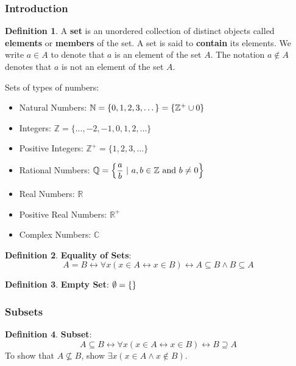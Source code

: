 \documentclass[article, 11pt]{article}
\theoremstyle{definition}
\newtheorem{definition}{Definition}[section]
\newcommand{\lra}{\leftrightarrow} %
\newcommand{\df}{\displaystyle\frac} %
\DeclarePairedDelimiter\set{\{}{\}}
\newcommand{\unite}{\cup}
\newcommand{\reals}{\mathbb{R}}
\newcommand{\ints}{\mathbb{Z}}
\newcommand{\posints}{\mathbb{Z}^+}
\newcommand{\nats}{\mathbb{N}} %
\newcommand{\rats}{\mathbb{Q}}
\newcommand{\comps}{\mathbb{C}}
\begin{document}
    \subsubsection{Introduction}
    \begin{definition}
        A \textbf{set} is an unordered collection of distinct objects called \textbf{elements} or \textbf{members} of the set. A set is said to \textbf{contain} its elements. We write $a \in A$ to denote that $a$ is an element of the set $A$. The notation $a \notin A$ denotes that $a$ is not an element of the set $A$.   
    \end{definition}

    Sets of types of numbers:
    \begin{itemize}
        \item Natural Numbers: $\nats = \{0, 1, 2, 3, \dots\} = \set*{\posints \unite 0}$
        \item Integers: $\ints = \{..., -2, -1, 0, 1, 2, \dots\}$
        \item Positive Integers: $\ints^+ = \{1, 2, 3, \dots\}$
        \item Rational Numbers: $\rats = \set*{\df{a}{b} \ | \ a, b \in \ints \text{ and } b \neq 0}$
        \item Real Numbers: $\reals$
        \item Positive Real Numbers: $\reals^+$
        \item Complex Numbers: $\comps$
    \end{itemize}

    \begin{definition}
        \textbf{Equality of Sets}:
        \begin{equation*}
            A=B \lra \forall x (x \in A \lra x \in B) \lra A \subseteq B \land B \subseteq A   
        \end{equation*}
    \end{definition}

    \begin{definition}
        \textbf{Empty Set}: $\emptyset = \set*{}$
    \end{definition}
    \subsubsection{Subsets}
    \begin{definition}
        \textbf{Subset}:
        \begin{equation*}
            A \subseteq B \lra \forall x (x \in A \lra x \in B) \lra B \supseteq A
        \end{equation*}
        To show that $A \not\subseteq B$, show $\exists x (x \in A \land x \not\in B)$.
    \end{definition}
\end{document}
